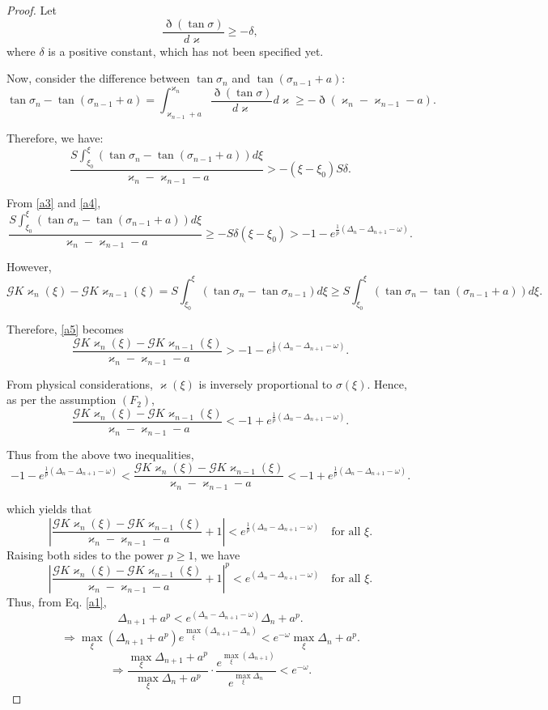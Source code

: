\documentclass[10pt,a4paper]{amsart}
\begin{document}
\begin{proof}
Let
\begin{equation*}
\frac{\eth(\tan \sigma)}{d\varkappa} \ge -\delta , 
\end{equation*}
where $\delta$ is a positive constant, which has not been specified yet.

Now, consider the difference between $\tan \sigma_n$ and $\tan (\sigma_{n-1}+a)$:
\[
\tan \sigma_n - \tan (\sigma_{n-1}+a) = \int_{\varkappa_{n-1}+a}^{\varkappa_n} \frac{\eth(\tan \sigma)}{d\varkappa} d\varkappa \ge -\eth(\varkappa_n-\varkappa_{n-1}-a).
\]

Therefore, we have:
\begin{equation}\label{a4}
\frac{S \int_{\xi_0}^{\xi } (\tan \sigma_n - \tan (\sigma_{n-1}+a)) d\xi} {\varkappa_n - \varkappa_{n-1}-a} > - (\xi - \xi_0)S\delta.
\end{equation}

From \eqref{a3} and \eqref{a4},
\begin{equation}\label{a5}
\frac{S \int_{\xi_0}^{\xi } (\tan \sigma_n - \tan (\sigma_{n-1}+a)) d\xi} {\varkappa_n - \varkappa_{n-1}-a}\ge -S\delta(\xi-\xi_0) > - 1 - e^{\frac{1}{p}(\Delta_n-\Delta_{n+1}-\omega  )}. 
\end{equation}

However,
\[
\mathcal{G}K\varkappa_n(\xi) - \mathcal{G}K\varkappa_{n-1}(\xi)
= S \int_{\xi_0}^{\xi } (\tan \sigma_n - \tan \sigma_{n-1}) d\xi \ge S \int_{\xi_0}^{\xi } (\tan \sigma_n - \tan (\sigma_{n-1}+a)) d\xi.
\]

Therefore, \eqref{a5} becomes
\[
\frac{\mathcal{G}K\varkappa_n(\xi) - \mathcal{G}K\varkappa_{n-1}(\xi)}{\varkappa_n - \varkappa_{n-1}-a} >  - 1 - e^{\frac{1}{p}(\Delta_n-\Delta_{n+1}-\omega  )}.
\]

From physical considerations, $\varkappa(\xi)$ is inversely proportional to $\sigma(\xi)$. Hence, as per the assumption $(F_2)$,
\[
\dfrac{\mathcal{G}K\varkappa_{n}(\xi) - \mathcal{G}K\varkappa_{n-1}(\xi)}{\varkappa_n - \varkappa_{n-1}-a} < -1 + e^{\frac{1}{p}(\Delta_n-\Delta_{n+1}-\omega  )}.
\]

Thus from the above two inequalities,
\[
-1 - e^{\frac{1}{p}(\Delta_n-\Delta_{n+1}-\omega  )} < \frac{\mathcal{G}K\varkappa_n(\xi) - \mathcal{G}K\varkappa_{n-1}(\xi)}{\varkappa_n - \varkappa_{n-1}-a} < -1 + e^{\frac{1}{p}(\Delta_n-\Delta_{n+1}-\omega  )}.
\]

which yields that
\[
\left| \frac{\mathcal{G}K\varkappa_n(\xi) - \mathcal{G}K\varkappa_{n-1}(\xi)}{\varkappa_n - \varkappa_{n-1}-a} + 1 \right| < e^{\frac{1}{p}(\Delta_n-\Delta_{n+1}-\omega  )}
\quad \text{for all } \xi.
\]
Raising both sides to the power $p\ge1$, we have
\[
\left| \frac{\mathcal{G}K\varkappa_n(\xi) - \mathcal{G}K\varkappa_{n-1}(\xi)}{\varkappa_n - \varkappa_{n-1}-a} + 1 \right|^p < e^{(\Delta_n-\Delta_{n+1}-\omega  )}
\quad \text{for all } \xi.
\]
Thus, from Eq. \eqref{a1},
\[
\Delta_{n+1}+a^p < e^{(\Delta_n-\Delta_{n+1}-\omega  )} \Delta_n+a^p.
\]
\[\Rightarrow \max_{\xi }\left(\Delta_{n+1}+a^p\right)e^{\max_{\xi }(\Delta_{n+1}-\Delta_n)} < e^{-\omega  } \max_{\xi }\Delta_n+a^p.\]
\[\Rightarrow \frac{\max_{\xi }\Delta_{n+1}+a^p}{\max_{\xi }\Delta_n+a^p}\cdot\frac{e^{\max_{\xi }(\Delta_{n+1})}}{e^{\max_{\xi }\Delta_n}} < e^{-\omega  } .\]


\end{proof}
\end{document}
